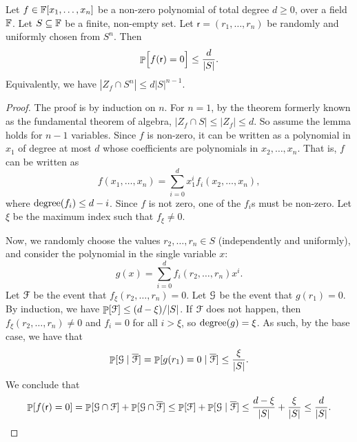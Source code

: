 \begin{lemma}
    Let
    \begin{math}
        f \in \mathbb{F}[x_1, \ldots, x_n]
    \end{math}
    be a non-zero polynomial of total degree $d \geq 0$, over a field
    $\mathbb{F}$.  Let $S \subseteq \mathbb{F}$ be a finite, non-empty set. Let
    $\mathsf{r} = (r_1, \ldots, r_n)$ be randomly and uniformly chosen
    from $S^n$. Then
    \begin{equation*}
        \Prob{ \Bigl.f( \mathsf{r} ) = 0 } \leq \frac{d}{|S|}.
    \end{equation*}
    Equivalently, we have $|Z_f \cap S^n| \leq d |S|^{n-1}$.
\end{lemma}
\begin{proof}
    The proof is by induction on $n$. For $n = 1$, by the theorem
    formerly known as the fundamental theorem of algebra,
    $|Z_f \cap S| \leq |Z_f| \leq d$. So assume the lemma holds for
    $n-1$ variables. Since $f$ is non-zero, it can be written as a
    polynomial in $x_1$ of degree at most $d$ whose coefficients are
    polynomials in $x_2, \ldots, x_n$. That is, $f$ can be written as
    \begin{equation*}
        f(x_1, \ldots, x_n)
        =%
        \sum_{i=0}^d x_1^i f_i(x_2, \ldots, x_n),
    \end{equation*}
    where $\degreeX{f_i} \leq d-i$.  Since $f$ is not zero, one of the
    $f_i$s must be non-zero. Let $\xi$ be the maximum index such that
    $f_\xi \neq 0$.

    Now, we randomly choose the values $r_2, \ldots, r_n \in S$
    (independently and uniformly), and consider the polynomial in the
    single variable $x$:
    \begin{equation*}
        g(x) = \sum_{i=0}^d f_i(r_2, \ldots,r_n) x^i.%
    \end{equation*}
    Let $\EuScript{F}$ be the event that $f_\xi(r_2, \ldots, r_n) = 0$.  Let
    $\EuScript{G}$ be the event that $g(r_1) = 0$.  By induction, we have
    $\Prob{\EventF} \leq (d-\xi)/|S|$. If $\EuScript{F}$ does not happen, then
    $f_\xi(r_2, \ldots, r_n) \neq 0$ and $f_i = 0$ for all $i > \xi$, so
    $\degreeX{g} = \xi$.  As such, by the base case, we have that
    \begin{equation*}
        \ProbCond{ \EventG}{\smash{\overline{\EventF}}} = \ProbCond{ g(r_1)
           = 0}{\smash{\overline{\EventF}}}%
        \leq%
        \frac{\xi}{|S|}.
    \end{equation*}
    We conclude that
    \begin{equation*}
        \Prob{f(\mathsf{r}) = 0}
        =%
        \Prob{\EventG \cap \EventF}
        + 
        \Prob{\EventG \cap \smash{ \overline{\EventF}}}
        \leq%
        \Prob{\EventF} +
        \ProbCond{\EventG}{\smash{\overline{\EventF}} }
        \leq
        \frac{d-\xi}{|S|} + \frac{\xi}{|S|}%
        \leq%
        \frac{d}{|S|}.
  \end{equation*}
\end{proof}

